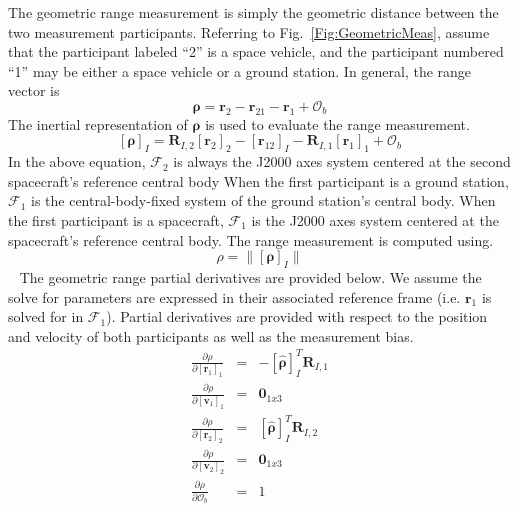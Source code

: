 The geometric range measurement is simply the geometric distance
between the two measurement participants.  Referring to
Fig.~\ref{Fig:GeometricMeas}, assume that the participant labeled
``2'' is a space vehicle, and the participant numbered ``1'' may be
either a space vehicle or a ground station.  In general, the range
vector is
%
\begin{equation}
    \boldsymbol{\rho} = \mathbf{r}_2 - \mathbf{r}_{21} -\mathbf{r}_1 + \mathcal{O}_b
\end{equation}
%
The inertial representation of $ \boldsymbol{\rho}$ is used to evaluate the range measurement.
%
\begin{equation}
   \left[ \boldsymbol{\rho}  \right]_{I} = \mathbf{R}_{I,2}\left[ \mathbf{r}_2 \right]_{2} - \left[\mathbf{r}_{12}\right]_{I}
    - \mathbf{R}_{I,1}  \left[ \mathbf{r}_1 \right]_{1} + \mathcal{O}_b
\end{equation}
%
In the above equation,  $\mathcal{F}_2$ is always
the J2000 axes system
centered at the second spacecraft's reference central body
 When the first participant is a ground station, $\mathcal{F}_1$ is
the central-body-fixed system of the ground station's central body.
When the first participant is a spacecraft,
$\mathcal{F}_1$ is the J2000 axes system
centered at the spacecraft's reference central body.  The range measurement is computed using.
%
\begin{equation}
   \rho = \| \left[ \boldsymbol{\rho}  \right]_{I}\|
\end{equation}\
%
The geometric range partial derivatives are provided below.  We
assume the solve for parameters are expressed in their associated
reference frame (i.e. $\mathbf{r}_1$ is solved for in
$\mathcal{F}_1$).  Partial derivatives are provided with respect to
the position and velocity of both participants as well as the
measurement bias.
%
\begin{eqnarray}
    \frac{\partial \rho}{\partial \left[ \mathbf{r}_1 \right]_{1}} & = & -\left[\boldsymbol{\hat{\rho}}  \right]_{I}^T \mathbf{R}_{I,1}\\
    \frac{\partial \rho}{\partial \left[ \mathbf{v}_1 \right]_{1}} & = & \mathbf{0}_{1x3}\\
    \frac{\partial \rho}{\partial \left[ \mathbf{r}_2 \right]_{2}} & = & \left[\boldsymbol{\hat{\rho}}  \right]_{I}^T \mathbf{R}_{I,2}\\
    \frac{\partial \rho}{\partial \left[ \mathbf{v}_2 \right]_{2}} & = & \mathbf{0}_{1x3}\\
    \frac{\partial \rho}{\partial  \mathcal{O}_b } & = & 1
\end{eqnarray}




